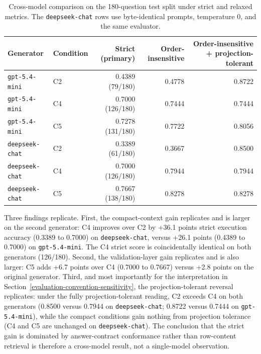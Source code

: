 \documentclass{article}
\begin{document}
\begin{table}[H]

\caption{Cross-model comparison on the 180-question test split under strict and relaxed metrics. The \texttt{deepseek-chat} rows use byte-identical prompts, temperature 0, and the same evaluator.}
\label{tab:second-model}
\centering

\begin{tabular}{llrrr}
\toprule
\textbf{Generator} & \textbf{Condition} & \textbf{Strict (primary)} & \textbf{Order-insensitive} & \textbf{Order-insensitive + projection-tolerant} \\
\midrule
\texttt{gpt-5.4-mini} & C2 & 0.4389 (79/180) & 0.4778 & 0.8722 \\
\texttt{gpt-5.4-mini} & C4 & 0.7000 (126/180) & 0.7444 & 0.7444 \\
\texttt{gpt-5.4-mini} & C5 & 0.7278 (131/180) & 0.7722 & 0.8056 \\
\midrule
\texttt{deepseek-chat} & C2 & 0.3389 (61/180) & 0.3667 & 0.8500 \\
\texttt{deepseek-chat} & C4 & 0.7000 (126/180) & 0.7944 & 0.7944 \\
\texttt{deepseek-chat} & C5 & 0.7667 (138/180) & 0.8278 & 0.8278 \\
\bottomrule
\end{tabular}

\end{table}

Three findings replicate. First, the compact-context gain replicates and is larger on the second generator: C4 improves over C2 by +36.1 points strict execution accuracy (0.3389 to 0.7000) on \texttt{deepseek-chat}, versus +26.1 points (0.4389 to 0.7000) on \texttt{gpt-5.4-mini}. The C4 strict score is coincidentally identical on both generators (126/180). Second, the validation-layer gain replicates and is also larger: C5 adds +6.7 points over C4 (0.7000 to 0.7667) versus +2.8 points on the original generator. Third, and most importantly for the interpretation in Section~\ref{evaluation-convention-sensitivity}, the projection-tolerant reversal replicates: under the fully projection-tolerant reading, C2 exceeds C4 on both generators (0.8500 versus 0.7944 on \texttt{deepseek-chat}; 0.8722 versus 0.7444 on \texttt{gpt-5.4-mini}), while the compact conditions gain nothing from projection tolerance (C4 and C5 are unchanged on \texttt{deepseek-chat}). The conclusion that the strict gain is dominated by answer-contract conformance rather than row-content retrieval is therefore a cross-model result, not a single-model observation.
\end{document}
